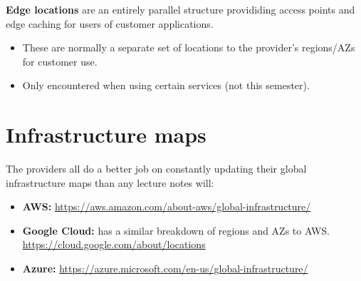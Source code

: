 \textbf{Edge locations} are an entirely parallel structure provididing access points and edge caching for users of customer applications.
\begin{itemize}
\item These are normally a separate set of locations to the provider's regions/AZs for customer use.
\item Only encountered when using certain services (not this semester).
\end{itemize}



\section{Infrastructure maps}
\label{sec:infrastructure-maps}

The providers all do a better job on constantly updating their global
infrastructure maps than any lecture notes will:

\begin{itemize}
\item
  \textbf{AWS:}
  \url{https://aws.amazon.com/about-aws/global-infrastructure/}
\item
  \textbf{Google Cloud:} has a similar breakdown of regions and AZs to
  AWS. \url{https://cloud.google.com/about/locations}
\item
  \textbf{Azure:}
  \url{https://azure.microsoft.com/en-us/global-infrastructure/}
\end{itemize}



